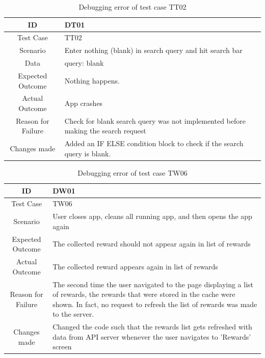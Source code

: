 \documentclass[12pt, a4paper, oneside]{article}
\begin{document}
\begin{table}[H]
\begin{tabularx}{\linewidth}{|c|X|}
\hline
\rowcolor[HTML]{C0C0C0} 
ID                 & DT01                                                                       \\ \hline
Test Case          & TT02                                                                       \\ \hline
Scenario           & Enter nothing (blank) in search query and hit search bar \\ \hline
Data & query: blank  \\ \hline
Expected Outcome   & Nothing happens.                                        \\ \hline
Actual Outcome     & App crashes                                           \\ \hline
Reason for Failure & Check for blank search query was not implemented before making the search request                                    \\ \hline
Changes made       & Added an IF ELSE condition block to check if the search query is blank.                       \\ \hline                  
\end{tabularx}
\caption{Debugging error of test case TT02}
\end{table}


\begin{table}[H]
\begin{tabularx}{\linewidth}{|c|X|}
\hline
\rowcolor[HTML]{C0C0C0} 
ID                 & DW01                                                                       \\ \hline
Test Case          & TW06                                                                       \\ \hline
Scenario           & User closes app, cleans all running app, and then opens the app again \\ \hline
Expected Outcome   & The collected reward should not appear again in list of rewards                                        \\ \hline
Actual Outcome     & The collected reward appears again in list of rewards                                           \\ \hline
Reason for Failure & The second time the user navigated to the page displaying a list of rewards, the rewards that were stored in the cache were shown. In fact, no request to refresh the list of rewards was made to the server.          \\ \hline
Changes made       & Changed the code such that the rewards list gets refreshed with data from API server whenever the user navigates to 'Rewards' screen                       \\ \hline                  
\end{tabularx}
\caption{Debugging error of test case TW06}
\end{table}
\end{document}
